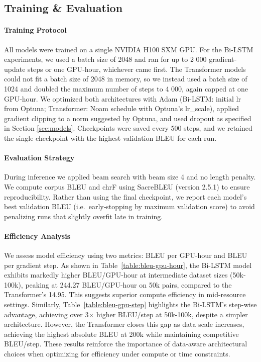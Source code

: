 \documentclass{article}
\begin{document}
\subsection{Training \& Evaluation}
\label{subsec:training}

\paragraph{Training Protocol}
All models were trained on a single NVIDIA H100 SXM GPU. For the Bi-LSTM experiments, we used a batch size of 2048 and ran for up to 2 000 gradient‐update steps or one GPU‐hour, whichever came first. The Transformer models could not fit a batch size of 2048 in memory, so we instead used a batch size of 1024 and doubled the maximum number of steps to 4 000, again capped at one GPU‐hour. We optimized both architectures with Adam (Bi-LSTM: initial lr from Optuna; Transformer: Noam schedule with Optuna’s lr\_scale), applied gradient clipping to a norm suggested by Optuna, and used dropout as specified in Section \ref{sec:models}. Checkpoints were saved every 500 steps, and we retained the single checkpoint with the highest validation BLEU for each run.
\paragraph{Evaluation Strategy}
\label{subsec:evaluation}
During inference we applied beam search with beam size 4 and no length penalty. We compute corpus BLEU and chrF using SacreBLEU \citep{post-2018-call} (version 2.5.1) to ensure reproducibility. Rather than using the final checkpoint, we report each model’s best validation BLEU (i.e.\ early‐stopping by maximum validation score) to avoid penalizing runs that slightly overfit late in training.

\paragraph{Efficiency Analysis}  
\label{subsec:efficiency}
We assess model efficiency using two metrics: BLEU per GPU-hour and BLEU per gradient step. As shown in Table~\ref{table:bleu-gpu-hour}, the Bi-LSTM model exhibits markedly higher BLEU/GPU-hour at intermediate dataset sizes (50k-100k), peaking at 244.27 BLEU/GPU-hour on 50k pairs, compared to the Transformer's 14.95. This suggests superior compute efficiency in mid-resource settings. Similarly, Table~\ref{table:bleu-gpu-step} highlights the Bi-LSTM’s step-wise advantage, achieving over 3× higher BLEU/step at 50k-100k, despite a simpler architecture. However, the Transformer closes this gap as data scale increases, achieving the highest absolute BLEU at 200k while maintaining competitive BLEU/step. These results reinforce the importance of data-aware architectural choices when optimizing for efficiency under compute or time constraints.
\end{document}
